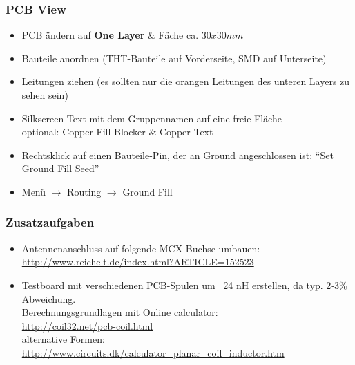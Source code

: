 \subsubsection{PCB View}

\begin{itemize}
    \item PCB ändern auf \textbf{One Layer} \& Fäche ca. $30x30mm$
    \item Bauteile anordnen (THT-Bauteile auf Vorderseite, SMD auf Unterseite)
    \item Leitungen ziehen (es sollten nur die orangen Leitungen des unteren Layers zu sehen sein)
    \item Silkscreen Text mit dem Gruppennamen auf eine freie Fläche \\
          optional: Copper Fill Blocker \& Copper Text
    \item Rechtsklick auf einen Bauteile-Pin, der an Ground angeschlossen ist: "`Set Ground Fill Seed"'
    \item Menü $\rightarrow$ Routing $\rightarrow$ Ground Fill
\end{itemize}

\subsubsection{Zusatzaufgaben}

\begin{itemize}
    \item Antennenanschluss auf folgende MCX-Buchse umbauen: \\
          \url{http://www.reichelt.de/index.html?ARTICLE=152523}
    \item Testboard mit verschiedenen PCB-Spulen um ~24 nH erstellen, da typ. 2-3\% Abweichung. \\
          Berechnungsgrundlagen mit Online calculator:\\
          \url{http://coil32.net/pcb-coil.html}\\
          alternative Formen: \\
          \url{http://www.circuits.dk/calculator_planar_coil_inductor.htm}
\end{itemize}
